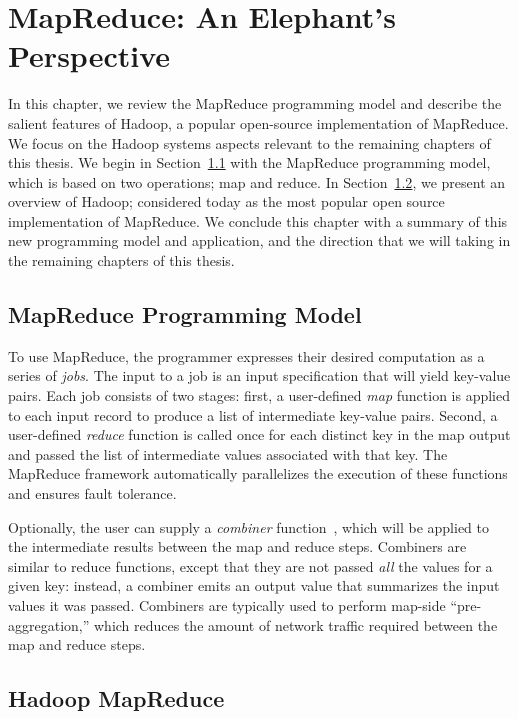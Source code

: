 \chapter[MapReduce: An Elephant's Perspective]{MapReduce: An Elephant's Perspective}
\label{ch:hadoop}

In this chapter, we review the MapReduce programming model and describe the
salient features of Hadoop, a popular open-source implementation of MapReduce.
We focus on the Hadoop systems aspects relevant to the remaining chapters of
this thesis.  We begin in Section~\ref{ch:hadoop:sec:progmodel} with the
MapReduce programming model, which is based on two operations; map and reduce.
In Section~\ref{ch:hadoop:sec:hadoop}, we present an overview of Hadoop;
considered today as the most popular open source implementation of MapReduce.
We conclude this chapter with a summary of this new programming model and
application, and the direction that we will taking in the remaining chapters of
this thesis.  \cite{foobar}

\section{MapReduce Programming Model}
\label{ch:hadoop:sec:progmodel}

To use MapReduce, the programmer expresses their desired computation as a
series of \emph{jobs}.  The input to a job is an input specification that will
yield key-value pairs.  Each job consists of two stages: first, a user-defined
\emph{map} function is applied to each input record to produce a list of
intermediate key-value pairs.  Second, a user-defined \emph{reduce} function is
called once for each distinct key in the map output and passed the list of
intermediate values associated with that key.  The MapReduce framework
automatically parallelizes the execution of these functions and ensures fault
tolerance.

Optionally, the user can supply a \emph{combiner}
function~\cite{mapreduce-osdi}, which will be applied to the intermediate results
between the map and reduce steps.  Combiners are similar to reduce functions,
except that they are not passed \emph{all} the values for a given key: instead,
a combiner emits an output value that summarizes the input values it was
passed.  Combiners are typically used to perform map-side ``pre-aggregation,''
which reduces the amount of network traffic required between the map and reduce
steps.

\section{Hadoop MapReduce}
\label{ch:hadoop:sec:hadoop}

